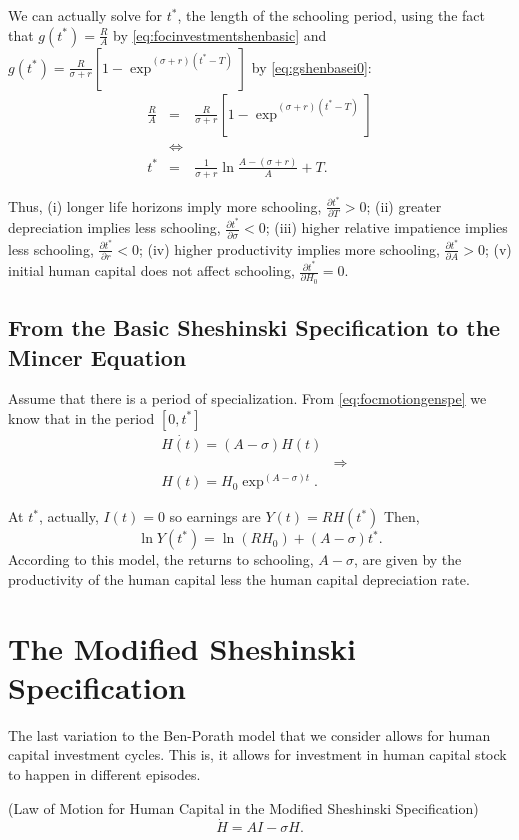 \indent We can actually solve for $t^*$, the length of the schooling period, using the fact that $g(t^*) = \frac{R}{A} $ by \eqref{eq:focinvestmentshenbasic} and $g(t^*) = \frac{R}{\sigma + r} \left[1 - \exp^{(\sigma + r)(t^*-T)} \right]$ by \eqref{eq:gshenbasei0}:
\begin{eqnarray}
\frac{R}{A} &=& \frac{R}{\sigma + r} \left[1 - \exp^{(\sigma + r)(t^*-T)} \right] \nonumber \\
&\Leftrightarrow& \nonumber \\ 
t^* &=& \frac{1}{\sigma + r} \ln \frac{A - (\sigma + r) }{A} + T.
\end{eqnarray}

\indent Thus, (i) longer life horizons imply more schooling, $\frac{\partial t^*}{\partial T} > 0$; (ii) greater depreciation implies less schooling, $\frac{\partial t^*}{\partial \sigma} < 0$; (iii) higher relative impatience implies less schooling, $\frac{\partial t^*}{\partial r} < 0$; (iv) higher productivity implies more schooling, $\frac{\partial t^*}{\partial A} > 0$; (v) initial human capital does not affect schooling, $\frac{\partial t^*}{\partial H_{0}} = 0$.

\subsection{From the Basic Sheshinski Specification to the Mincer Equation}
Assume that there is a period of specialization. From \eqref{eq:focmotiongenspe} we know that in the period $[0,t^*]$
\begin{eqnarray}
\dot{H(t)} = (A - \sigma)H(t) \nonumber \\
&\Rightarrow& \nonumber \\ 
H(t) = H_{0} \exp^{(A - \sigma)t}.
\end{eqnarray}

\noindent At $t^*$, actually, $I(t) = 0$ so earnings are $Y(t) = R H(t^*)$ Then,
\begin{equation}
\ln Y(t^*) = \ln(RH_{0}) + (A - \sigma)t^*.
\end{equation} 
\noindent According to this model, the returns to schooling, $A-\sigma$, are given by the productivity of the human capital less the human capital depreciation rate.  

\section{The Modified Sheshinski Specification}
The last variation to the Ben-Porath model that we consider allows for human capital investment cycles. This is, it allows for investment in human capital stock to happen in different episodes.\\
\begin{definition} (Law of Motion for Human Capital in the Modified Sheshinski Specification)\\
\begin{equation}
\dot{H} = AI - \sigma H. \label{eq:modshenlaw}
\end{equation}
\end{definition}

